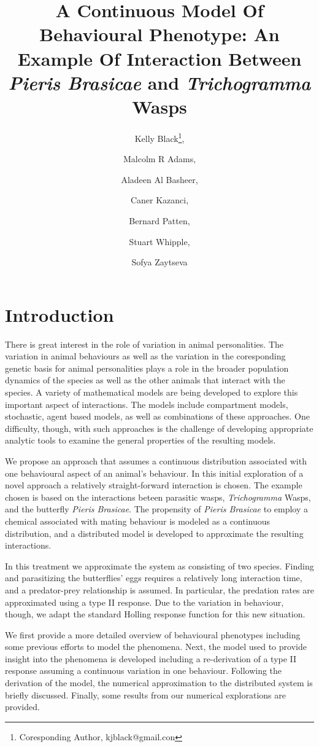 \documentclass[12pt]{article}
\title{A Continuous Model Of Behavioural Phenotype: An Example Of
  Interaction Between \textit{Pieris Brasicae} and
  \textit{Trichogramma} Wasps}
\author{Kelly Black\thanks{Coresponding Author, kjblack@gmail.con},
  \and Malcolm R Adams, \and Aladeen Al Basheer, \and Caner Kazanci,
  \and Bernard Patten, \and Stuart Whipple, \and Sofya Zaytseva}
\begin{document}
\maketitle

\section{Introduction}

There is great interest in the role of variation in animal
personalities\cite{doi:10.1111/j.1461-0248.2010.01536.x}.  The
variation in animal behaviours as well as the variation in the
coresponding genetic basis for animal personalities plays a role in
the broader population dynamics of the species as well as the other
animals that interact with the species. A variety of mathematical
models are being developed to explore this important aspect of
interactions. The models include compartment models, stochastic, agent
based models, as well as combinations of these approaches. One
difficulty, though, with such approaches is the challenge of
developing appropriate analytic tools to examine the general
properties of the resulting models.

We propose an approach that assumes a continuous distribution
associated with one behavioural aspect of an animal's behaviour. In
this initial exploration of a novel approach a relatively
straight-forward interaction is chosen. The example chosen is based on
the interactions beteen parasitic wasps, \textit{Trichogramma} Wasps,
and the butterfly \textit{Pieris
  Brasicae}\cite{10.1093/beheco/arq007}.  The propensity of
\textit{Pieris Brasicae} to employ a chemical associated with mating
behaviour is modeled as a continuous distribution, and a distributed
model is developed to approximate the resulting interactions.

In this treatment we approximate the system as consisting of two
species. Finding and parasitizing the butterflies' eggs requires a
relatively long interaction time, and a predator-prey relationship is
assumed. In particular, the predation rates are approximated using a
type II response. Due to the variation in behaviour, though, we adapt
the standard Holling response function for this new situation.

We first provide a more detailed overview of behavioural phenotypes
including some previous efforts to model the phenomena. Next, the
model used to provide insight into the phenomena is developed
including a re-derivation of a type II response assuming a continuous
variation in one behaviour. Following the derivation of the model, the
numerical approximation to the distributed system is briefly
discussed. Finally, some results from our numerical explorations are
provided.
\end{document}
